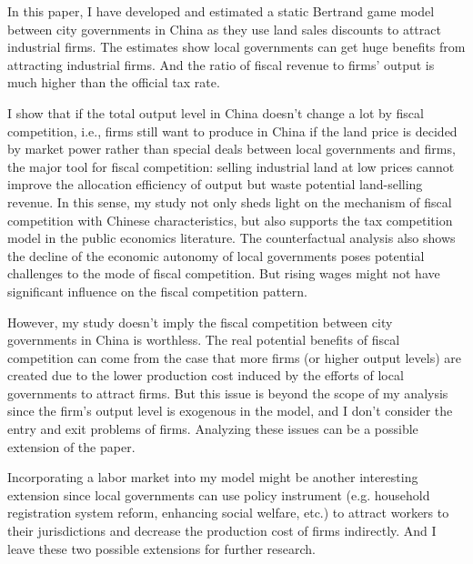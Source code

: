 In this paper, I have developed and estimated a static Bertrand game model between city governments in China
as they use land sales discounts to attract industrial firms. The estimates show
local governments can get huge benefits from attracting industrial
firms. And the ratio of fiscal revenue to firms' output is much higher
than the official tax rate.

I show that if the total output level in China doesn't change a lot
by fiscal competition, i.e., firms still want to produce in China if the land price
is decided by market power rather than special deals between local governments and firms, the major tool for fiscal competition:
selling industrial land at low prices cannot improve the allocation efficiency of output but waste
potential land-selling revenue. In this sense, my study not only
sheds light on the mechanism of fiscal competition with Chinese characteristics,
but also supports the tax competition model \citep{wilson1999theories}
in the public economics literature.
The counterfactual analysis also shows
the decline of the economic autonomy of local governments poses potential challenges to the mode of fiscal competition.
But rising wages might not have significant influence on the fiscal competition pattern.

However, my study doesn't imply the fiscal competition between city governments in
China is worthless. The real potential benefits of fiscal competition can come
from the case that more firms (or higher output levels) are created due to the
lower production cost induced by the efforts of local governments to
attract firms. But this issue is beyond the scope of my analysis since the firm's output level
is exogenous in the model, and I don't consider the entry and exit problems of firms.
Analyzing these issues can be a possible extension of the paper.

Incorporating a labor market into my model might be another interesting extension
since local governments can use policy instrument
(e.g. household registration system reform, enhancing social welfare, etc.)
to attract workers to their jurisdictions and decrease the production cost of firms indirectly.
And I leave these two possible extensions for further research.

